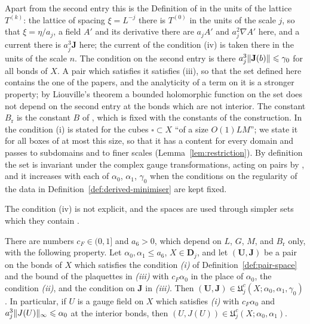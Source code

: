 \documentclass[11pt]{preprint}
\DeclarePairedDelimiter{\norm}{\lVert}{\rVert}
\numberwithin{equation}{section}
\begin{document}
Apart from the second entry this is the Definition of \cite[p.~262]{BalabanRG1} in the units of the lattice $T^{(k)}$: the lattice of spacing $\xi = L^{-j}$ there is $T^{(0)}$ in the units of the scale $j$, so that $\xi = \eta/a_j$, a field $A'$ and its derivative there are $a_jA'$ and $a_j^2\nabla A'$ here, and a current there is $a_j^3\mathbf J$ here; the current of the condition (iv) is taken there in the units of the scale $n$. The condition on the second entry is there $a_j^3\norm{\mathbf J(b)} \leqslant \gamma_0$ for all bonds of $X$. A pair which satisfies it satisfies (iii), so that the set defined here contains the one of the papers, and the analyticity of a term on it is a stronger property; by Liouville's theorem a bounded holomorphic function on the set does not depend on the second entry at the bonds which are not interior. The constant $B_{\mathrm r}$ is the constant $B$ of \cite[(1.12)]{BalabanRG1}, which is fixed with the constants of the construction. In \cite[(1.12)]{BalabanRG1} the condition (i) is stated for the cubes $\square \subset X$ ``of a size $O(1)LM$''; we state it for all boxes of at most this size, so that it has a content for every domain and passes to subdomains and to finer scales (Lemma~\ref{lem:restriction}). By definition the set is invariant under the complex gauge transformations, acting on pairs by \cite[(1.10)]{BalabanRG1}, and it increases with each of $\alpha_0$, $\alpha_1$, $\gamma_0$ when the conditions on the regularity of the data in Definition~\ref{def:derived-minimiser} are kept fixed.

The condition (iv) is not explicit, and the spaces are used through simpler sets which they contain \cite[p.~263]{BalabanRG1}.

\begin{proposition}\label{prop:membership}
There are numbers $c_F \in (0, 1]$ and $a_6 > 0$, which depend on $L$, $G$, $M$, and $B_{\mathrm r}$ only, with the following property. Let $\alpha_0, \alpha_1 \leqslant a_6$, $X \in \mathbf D_j$, and let $(\mathbf U, \mathbf J)$ be a pair on the bonds of $X$ which satisfies the condition \emph{(i)} of Definition~\ref{def:pair-space} and the bound of the plaquettes in \emph{(iii)} with $c_F\alpha_0$ in the place of $\alpha_0$, the condition \emph{(ii)}, and the condition on $\mathbf J$ in \emph{(iii)}. Then $(\mathbf U, \mathbf J) \in \mathfrak U^c_j(X; \alpha_0, \alpha_1, \gamma_0)$. In particular, if $U$ is a gauge field on $X$ which satisfies \emph{(i)} with $c_F\alpha_0$ and $a_j^3\norm{J(U)}_\infty \leqslant \alpha_0$ at the interior bonds, then $(U, J(U)) \in \mathfrak U^c_j(X; \alpha_0, \alpha_1)$.
\end{proposition}
\end{document}
